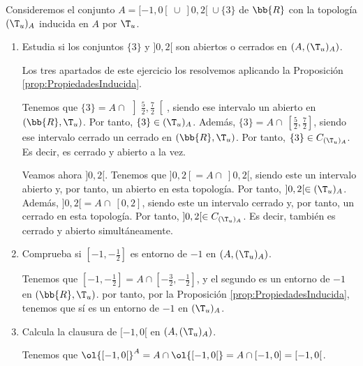\begin{ejercicio}
    Consideremos el conjunto $A=[-1, 0[~\cup~ ]0,2[~\cup \{3\}$ de $\bb{R}$ con la topología $(\T_u)_A$ inducida en $A$ por $\T_u$.
    \begin{enumerate}
        \item Estudia si los conjuntos $\{3\}$ y $]0,2[$ son abiertos o cerrados en $(A, (\T_u)_A)$.

        Los tres apartados de este ejercicio los resolvemos aplicando la Proposición \ref{prop:PropiedadesInducida}.

        Tenemos que $\{3\}=A\cap~\left]\frac{5}{2}, \frac{7}{2}\right[$, siendo ese intervalo un abierto en $(\bb{R},\T_u)$. Por tanto, $\{3\}\in (\T_u)_A$. Además, $\{3\}=A\cap~\left[\frac{5}{2}, \frac{7}{2}\right]$, siendo ese intervalo cerrado un cerrado en $(\bb{R},\T_u)$. Por tanto, $\{3\}\in C_{(\T_u)_A}$. Es decir, es cerrado y abierto a la vez.
    
        Veamos ahora $]0,2[$. Tenemos que $]0,2[=A\cap~ ]0,2[$, siendo este un intervalo abierto y, por tanto, un abierto en esta topología. Por tanto, $]0,2[\in (\T_u)_A$. Además, $]0,2[=A\cap~ [0,2]$, siendo este un intervalo cerrado y, por tanto, un cerrado en esta topología. Por tanto, $]0,2[\in C_{(\T_u)_A}$.  Es decir, también es cerrado y abierto simultáneamente.
        
        \item Comprueba si $\left[-1,-\frac{1}{2}\right]$ es entorno de $-1$ en $(A,(\T_u)_A)$.

        Tenemos que $\left[-1,-\frac{1}{2}\right]=A\cap \left[-\frac{3}{2},-\frac{1}{2}\right]$, y el segundo es un entorno de $-1$ en $(\bb{R},\T_u)$. por tanto, por la Proposición \ref{prop:PropiedadesInducida}, tenemos que sí es un entorno de $-1$ en $(\T_u)_A$.

        
        \item Calcula la clausura de $[-1, 0[$ en $(A,(\T_u)_A)$.

        Tenemos que $\ol{[-1, 0[}^A = A\cap \ol{[-1, 0[} = A\cap [-1,0]=[-1,0[$.
    \end{enumerate}
\end{ejercicio}

